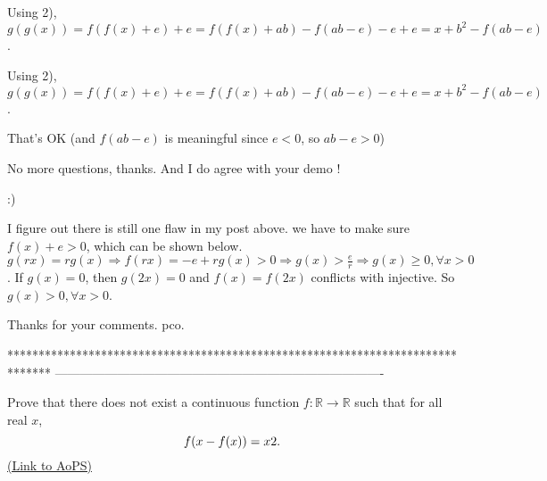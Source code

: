 \begin{solution}
	Using 2),
$ g(g(x))=f(f(x)+e)+e=f(f(x)+ab)-f(ab-e)-e+e=x+b^2-f(ab-e)$.
\end{solution}



\begin{solution}
	\begin{tcolorbox}Using 2),
$ g(g(x)) = f(f(x) + e) + e = f(f(x) + ab) - f(ab - e) - e + e = x + b^2 - f(ab - e)$.\end{tcolorbox}


That's OK (and $ f(ab-e)$ is meaningful since $ e<0$, so $ ab-e>0$)

No more questions, thanks.
And I do agree with your demo !

:)
\end{solution}



\begin{solution}
	I figure out there is still one flaw in my post above. we have to make sure $ f(x)+e>0$, which can be shown below.
$ g(rx)=rg(x)\Rightarrow f(rx)=-e+rg(x)>0\Rightarrow g(x)>\frac er\Rightarrow g(x)\ge0,\forall x>0$. If $ g(x)=0$, then $ g(2x)=0$ and $ f(x)=f(2x)$ conflicts with injective. So $ g(x)>0,\forall x>0$.

Thanks for your comments. pco.
\end{solution}
*******************************************************************************
-------------------------------------------------------------------------------

\begin{problem}
	Prove that there does not exist a continuous function $f: \mathbb R \to \mathbb R$ such that for all real $x$,
\[ f(x-f(x)) =x\/2.\]
	\flushright \href{https://artofproblemsolving.com/community/c6h271187}{(Link to AoPS)}
\end{problem}



